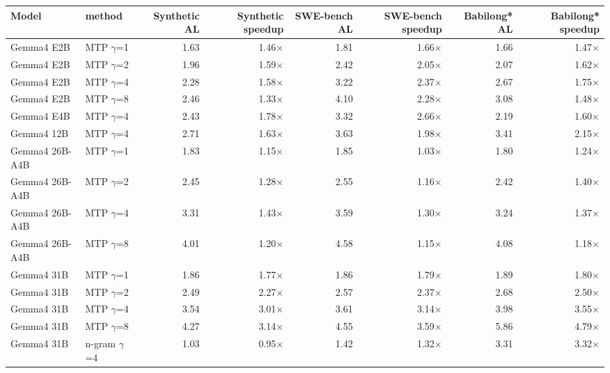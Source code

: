 \begin{tabular}{llrrrrrr}
\toprule
Model & method & Synthetic AL & Synthetic speedup & SWE-bench AL & SWE-bench speedup & Babilong* AL & Babilong* speedup \\
\midrule
Gemma4 E2B & MTP $\gamma$=1 & 1.63 & 1.46$\times$ & 1.81 & 1.66$\times$ & 1.66 & 1.47$\times$ \\
Gemma4 E2B & MTP $\gamma$=2 & 1.96 & 1.59$\times$ & 2.42 & 2.05$\times$ & 2.07 & 1.62$\times$ \\
Gemma4 E2B & MTP $\gamma$=4 & 2.28 & 1.58$\times$ & 3.22 & 2.37$\times$ & 2.67 & 1.75$\times$ \\
Gemma4 E2B & MTP $\gamma$=8 & 2.46 & 1.33$\times$ & 4.10 & 2.28$\times$ & 3.08 & 1.48$\times$ \\
Gemma4 E4B & MTP $\gamma$=4 & 2.43 & 1.78$\times$ & 3.32 & 2.66$\times$ & 2.19 & 1.60$\times$ \\
Gemma4 12B & MTP $\gamma$=4 & 2.71 & 1.63$\times$ & 3.63 & 1.98$\times$ & 3.41 & 2.15$\times$ \\
Gemma4 26B-A4B & MTP $\gamma$=1 & 1.83 & 1.15$\times$ & 1.85 & 1.03$\times$ & 1.80 & 1.24$\times$ \\
Gemma4 26B-A4B & MTP $\gamma$=2 & 2.45 & 1.28$\times$ & 2.55 & 1.16$\times$ & 2.42 & 1.40$\times$ \\
Gemma4 26B-A4B & MTP $\gamma$=4 & 3.31 & 1.43$\times$ & 3.59 & 1.30$\times$ & 3.24 & 1.37$\times$ \\
Gemma4 26B-A4B & MTP $\gamma$=8 & 4.01 & 1.20$\times$ & 4.58 & 1.15$\times$ & 4.08 & 1.18$\times$ \\
Gemma4 31B & MTP $\gamma$=1 & 1.86 & 1.77$\times$ & 1.86 & 1.79$\times$ & 1.89 & 1.80$\times$ \\
Gemma4 31B & MTP $\gamma$=2 & 2.49 & 2.27$\times$ & 2.57 & 2.37$\times$ & 2.68 & 2.50$\times$ \\
Gemma4 31B & MTP $\gamma$=4 & 3.54 & 3.01$\times$ & 3.61 & 3.14$\times$ & 3.98 & 3.55$\times$ \\
Gemma4 31B & MTP $\gamma$=8 & 4.27 & 3.14$\times$ & 4.55 & 3.59$\times$ & 5.86 & 4.79$\times$ \\
Gemma4 31B & n-gram $\gamma$=4 & 1.03 & 0.95$\times$ & 1.42 & 1.32$\times$ & 3.31 & 3.32$\times$ \\
\bottomrule
\end{tabular}
